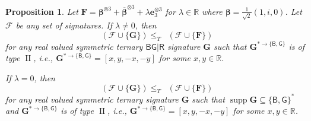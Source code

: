 \documentclass[11pt]{article}
\newtheorem{proposition}[theorem]{Proposition}
\DeclareMathOperator{\holts}{Holant^*_3}
\DeclareMathOperator{\supp}{supp}
\DeclareMathOperator{\typeii}{II}
\newcommand{\db}{\mathsf{B}}
\newcommand{\dg}{\mathsf{G}}
\newcommand{\dr}{\mathsf{R}}
\newcommand{\teh}{^{\otimes 3}}
\newcommand{\domres}[1]{
  ^{*\to\{#1\}}
}
\begin{document}
\begin{proposition}\label{lem:Z-normalization}
  Let $\mathbf{F} = \boldsymbol{\beta} \teh + \overline{\boldsymbol{\beta}} \teh + \lambda \mathbf{e}_3 \teh$ for $\lambda \in \mathbb{R}$ where $\boldsymbol{\beta} = \frac{1}{\sqrt{2}} (1, i, 0)$.
  Let $\mathcal{F}$ be any set of signatures.
  If $\lambda \ne 0$, then
\[
  \holts(\mathcal{F} \cup \{\mathbf{G}\}) \le_T
    \holts(\mathcal{F} \cup \{\mathbf{F}\})
  \]
  for any real valued symmetric ternary $\db \dg | \dr$ signature $\mathbf{G}$ such that 
   $\mathbf{G}\domres{\db, \dg}$ is of type $\typeii$,
   i.e., $\mathbf{G}\domres{\db, \dg} = [x, y, -x, -y]$ for some $x, y \in \mathbb{R}$.

   If $\lambda = 0$, then 
   \[
  \holts(\mathcal{F} \cup \{\mathbf{G}\}) \le_T
    \holts(\mathcal{F} \cup \{\mathbf{F}\})
  \]
  for any real valued symmetric ternary signature $\mathbf{G}$ such that $\supp \mathbf{G} \subseteq \{\db, \dg \}^*$ and 
   $\mathbf{G}\domres{\db, \dg}$ is of type $\typeii$,
   i.e., $\mathbf{G}\domres{\db, \dg} = [x, y, -x, -y]$ for some $x, y \in \mathbb{R}$.
\end{proposition}
\end{document}
